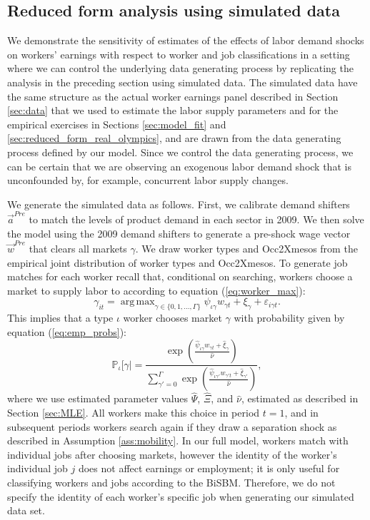 \documentclass[12pt]{article}
\def\ig{\iota\gamma}
\def\g{\gamma}
\def\i{\iota}
\DeclareMathOperator*{\argmax}{arg\,max}
\renewcommand{\P}{\mathbb {P}}
\theoremstyle{definition}
\theoremstyle{plain}
\def\ve{\varepsilon}
\begin{document}
\subsection{Reduced form analysis using simulated data}


\label{sec:reduced_form_fake_olympics}


We demonstrate the sensitivity of estimates of the effects of labor demand shocks on workers' earnings with respect to worker and job classifications in a setting where we can control the underlying data generating process by replicating the analysis in the preceding section using simulated data. The simulated data have the same structure as the actual worker earnings panel described in Section \ref{sec:data} that we used to estimate the labor supply parameters and for the empirical exercises in Sections \ref{sec:model_fit} and \ref{sec:reduced_form_real_olympics}, and are drawn from the data generating process defined by our model. Since we control the data generating process, we can be certain that we are observing an exogenous labor demand shock that is unconfounded by, for example, concurrent labor supply changes. 

We generate the simulated data as follows. First, we calibrate demand shifters $\vec{a}^{Pre}$ to match the levels of product demand in each sector in 2009. We then solve the model using the 2009 demand shifters to generate a pre-shock wage vector $\vec{w}^{Pre}$ that clears all markets $\g$. We draw worker types and Occ2Xmesos from the empirical joint distribution of worker types and Occ2Xmesos. To generate job matches for each worker recall that, conditional on searching, workers choose a market to supply labor to according to equation (\ref{eq:worker_max}):
\[\g_{it} = \argmax_{\g \in \{0,1,\dots,\Gamma\}} \psi_{\ig} w_{\g t} + \xi_{\g} + \ve_{i\g t} .\] 
This implies that a type $\i$ worker chooses market $\g$ with probability given by equation (\ref{eq:emp_probs}): 
\[\P_{\i}[\g | = \frac{\exp \left( \frac{\hat\psi_{\ig} w_{\g t} + \hat\xi_{\g}}{\hat\nu} \right) }{ \sum\limits_{\g'=0}^{\Gamma} \exp \left( \frac{\hat\psi_{\ig'} w_{\g' t} + \hat\xi_{\g'}}{\hat\nu} \right) },\] 
where we use estimated parameter values $\hat \Psi$, $\hat \Xi$, and $\hat \nu$, estimated as described in Section \ref{sec:MLE}. All workers make this choice in period $t=1$, and in subsequent periods workers search again if they draw a separation shock as described in Assumption \ref{ass:mobility}. In our full model, workers match with individual jobs after choosing markets, however the identity of the worker's individual job $j$ does not affect earnings or employment; it is only useful for classifying workers and jobs according to the BiSBM. Therefore, we do not specify the identity of each worker's specific job when generating our simulated data set. 
\end{document}
